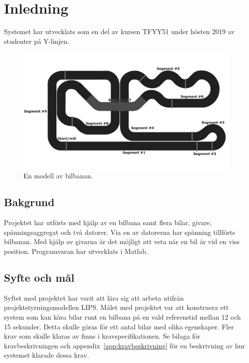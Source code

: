 \section{Inledning}

Systemet har utvecklats som en del av kursen TFYY51 under hösten 2019 av
studenter på Y-linjen.

\begin{figure}
	\centering
	\includegraphics[width=\linewidth] {Figures/BanaModell}
	\caption{En modell av bilbanan.}
	\label{fig:bilbanan}
\end{figure} 

\subsection{Bakgrund} 

Projektet har utförts med hjälp av en bilbana samt flera bilar, givare,
spänningsaggregat och två datorer. Via en av datorerna har spänning tillförts
bilbanan. Med hjälp av givarna är det möjligt att veta när en bil är vid en viss
position. Programvaran har utvecklats i Matlab.

\subsection{Syfte och mål}

Syftet med projektet har varit att lära sig att arbeta utifrån
projektstyrningsmodellen LIPS. Målet med projektet var att konstruera ett system
som kan köra bilar runt en bilbana på en vald referenstid mellan 12 och 15
sekunder. Detta skulle göras för ett antal bilar med olika egenskaper. Fler krav
som skulle klaras av finns i kravspecifikationen. Se bilaga för
kravbeskrivningen och appendix~\ref{app:kravbeskrivning} för en beskrivning av
hur systemet klarade dessa krav.

